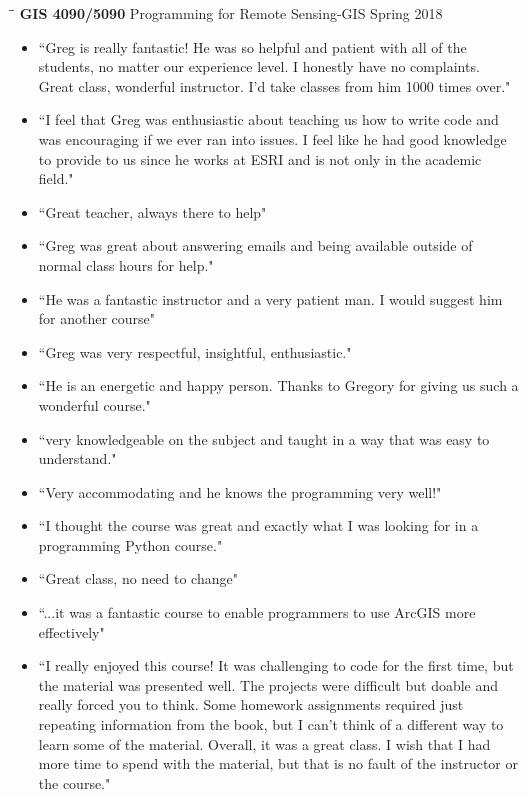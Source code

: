 \documentclass{res}
\begin{document}
\begin{resume}
\begin{tabbing}
	\hspace{2.3in}\= \hspace{2.6in}\= \kill %
	{\bf GIS 4090/5090} \>Programming for Remote Sensing-GIS     \>Spring 2018\\
	\>
\end{tabbing}\vspace{-20pt}      %
\begin{itemize}  
\item``Greg is really fantastic! He was so helpful and patient with all of the students, no matter our experience level. I honestly have no complaints. Great class, wonderful instructor. I'd take classes from him 1000 times over."
\item``I feel that Greg was enthusiastic about teaching us how to write code and was encouraging if we ever ran into issues. I feel like he had good knowledge to provide to us since he works at ESRI and is not only in the academic field."
\item``Great teacher, always there to help"
\item``Greg was great about answering emails and being available outside of normal class hours for help."
\item``He was a fantastic instructor and a very patient man. I would suggest him for another course"
\item``Greg was very respectful, insightful, enthusiastic."
\item``He is an energetic and happy person. Thanks to Gregory for giving us such a wonderful course."
\item``very knowledgeable on the subject and taught in a way that was easy to understand."
\item``Very accommodating and he knows the programming very well!"
\item``I thought the course was great and exactly what I was looking for in a programming Python course."
\item``Great class, no need to change"
\item``...it was a fantastic course to enable programmers to use ArcGIS more effectively"
\item``I really enjoyed this course! It was challenging to code for the first time, but the material was presented well. The projects were difficult but doable and really forced you to think. Some homework assignments required just repeating information from the book, but I can't think of a different way to learn some of the material. Overall, it was a great class. I wish that I had more time to spend with the material, but that is no fault of the instructor or the course."

\end{itemize}
\end{resume}
\end{document}
